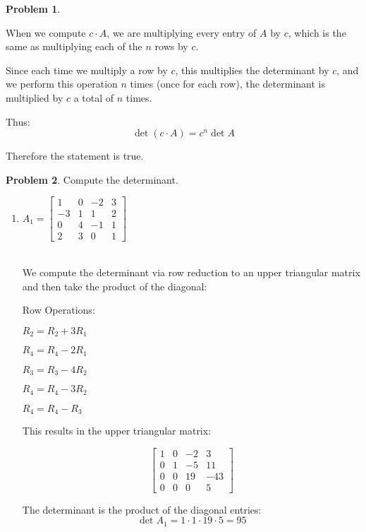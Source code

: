 \documentclass[12pt, oneside]{amsart}
\theoremstyle{definition}
\newtheorem{prob}{Problem}
\begin{document}
\begin{prob}
\begin{enumerate}
\begin{solution}
    When we compute $c \cdot A$, we are multiplying every entry of $A$ by $c$, which is the same as multiplying each of the $n$ rows by $c$.
    
    Since each time we multiply a row by $c$, this multiplies the determinant by $c$, and we perform this operation $n$ times (once for each row), the determinant is multiplied by $c$ a total of $n$ times.

    Thus:
    \[
    \det(c \cdot A) = c^n \det A
    \]
    
    Therefore the statement is true.
    \end{solution}
\end{enumerate}
\end{prob}

\begin{prob} Compute the determinant.
\begin{enumerate}
    \item $A_1= \left[\begin{matrix}
        1 & 0 & -2 & 3 \\
        -3 & 1 & 1 & 2 \\
        0 & 4 & -1 & 1 \\
        2 & 3 & 0 & 1
    \end{matrix}\right]$\\\\
    
    \begin{solution}
    We compute the determinant via row reduction to an upper triangular matrix and then take the product of the diagonal:
    
    Row Operations:
    
    $R_2 = R_2 + 3R_1$
    
    $R_4 = R_4 - 2R_1$
    
    $R_3 = R_3 - 4R_2$
    
    $R_4 = R_4 - 3R_2$
    
    $R_4 = R_4 - R_3$

    This results in the upper triangular matrix:
    
    \[
    \begin{bmatrix}
    1 & 0 & -2 & 3 \\
    0 & 1 & -5 & 11 \\
    0 & 0 & 19 & -43 \\
    0 & 0 & 0 & 5
    \end{bmatrix}
    \]
    
    The determinant is the product of the diagonal entries:
    \[
    \det A_1 = 1 \cdot 1 \cdot 19 \cdot 5 = 95
    \]
    \end{solution}
    

\end{enumerate}
\end{prob}
\end{document}
